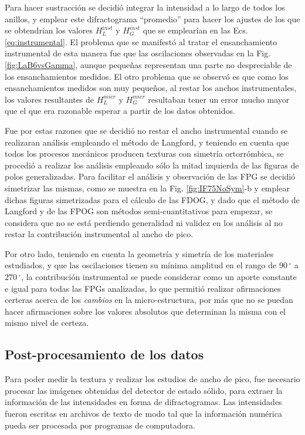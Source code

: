 Para hacer sustracción se decidió integrar la intensidad a lo largo de todos los anillos, y emplear este difractograma ``promedio'' para hacer los ajustes de los que se obtendrían los valores $H_L^{inst}$ y $H_G^{inst}$  que se emplearían en las Ecs. \ref{eq:instrumental}.
El problema que se manifestó al tratar el ensanchamiento instrumental de esta manera fue que las oscilaciones observadas en la Fig. \ref{fig:LaB6vsGamma}, aunque pequeñas representan una parte no despreciable de los ensanchamientos medidos.
El otro problema que se observó es que como los ensanchamientos medidos son muy pequeños, al restar los anchos instrumentales, los valores resultantes de $H_L^{micr}$ y $H_G^{micr}$ resultaban tener un error mucho mayor que el que era razonable esperar a partir de los datos obtenidos.

Fue por estas razones que se decidió no restar el ancho instrumental cuando se realizaran análisis empleando el método de Langford, y teniendo en cuenta que todos los procesos mecánicos producen texturas con simetría ortorrómbica, se procedió a realizar los análisis empleando sólo la mitad izquierda de las figuras de polos generalizadas.
Para facilitar el análisis y observación de las FPG se decidió simetrizar las mismas, como se muestra en la Fig. \ref{fig:IF75NoSym}-b y emplear dichas figuras simetrizadas para el cálculo de las FDOG, y dado que el método de Langford y de las FPOG son métodos semi-cuantitativos para empezar, se considera que no se está perdiendo generalidad ni validez en los análisis al no restar la contribución instrumental al ancho de pico.

Por otro lado, teniendo en cuenta la geometría y simetría de los materiales estudiados, y que las oscilaciones tienen su mínima amplitud en el rango de 90\,$^{\circ}$ a 270\,$^{\circ}$, la contribución instrumental se puede considerar como un aporte constante e igual para todas las FPGs analizadas, lo que permitió realizar afirmaciones certeras acerca de los \textit{cambios} en la micro-estructura, por más que no se puedan hacer afirmaciones sobre los valores absolutos que determinan la misma con el mismo nivel de certeza.

\subsection{Post-procesamiento de los datos}\label{SS:MatPost}
Para poder medir la textura y realizar los estudios de ancho de pico, fue necesario procesar las imágenes obtenidas del detector de estado sólido, para extraer la información de las intensidades en forma de difractogramas. 
Las intensidades fueron escritas en archivos de texto de modo tal que la información numérica pueda ser procesada por programas de computadora.

